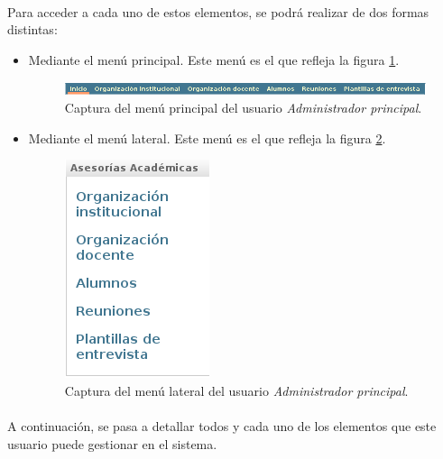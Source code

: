   \paragraph{}Para acceder a cada uno de estos elementos, se podrá realizar de
  dos formas distintas:

  \begin{itemize}
   \item Mediante el menú principal. Este menú es el que refleja la figura
   \ref{capturaMenuPrincipalAdminPrincipal}.

  \begin{figure}[!ht]
    \begin{center}
      \includegraphics[scale=0.55]{4.Funcionamiento_Aplicacion/4.3.Gestion/4.3.1.Administrador_Principal/4.3.1.1.Introduccion/menu_principal.png}
      \caption{Captura del menú principal del usuario \textit{Administrador principal}.}
      \label{capturaMenuPrincipalAdminPrincipal}
    \end{center}
  \end{figure}

   \item Mediante el menú lateral. Este menú es el que refleja la figura
   \ref{capturaMenuLateralAdminPrincipal}.

   \begin{figure}[!ht]
    \begin{center}
      \includegraphics[scale=0.55]{4.Funcionamiento_Aplicacion/4.3.Gestion/4.3.1.Administrador_Principal/4.3.1.1.Introduccion/menu_lateral.png}
      \caption{Captura del menú lateral del usuario \textit{Administrador principal}.}
      \label{capturaMenuLateralAdminPrincipal}
    \end{center}
  \end{figure}

  \end{itemize}


  \paragraph{}A continuación, se pasa a detallar todos y cada uno de los
  elementos que este usuario puede gestionar en el sistema.

